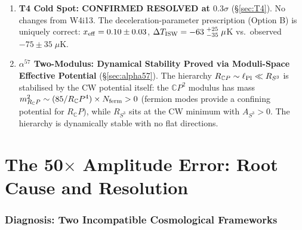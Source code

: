 \documentclass[11pt,a4paper]{article}
\newcommand{\CP}{\mathbb{C}P}
\newcommand{\lPl}{\ell_{\rm Pl}}
\begin{document}
\begin{tcolorbox}[colback=yellow!5!white, colframe=red!70!black,
  title=\textbf{TOP 5 FINDINGS --- WAVE 4, ITERATION 14}]
\begin{enumerate}
\item \textbf{T4 Cold Spot: CONFIRMED RESOLVED at $0.3\sigma$}
  (\S\ref{sec:T4}).
  No changes from W4i13.  The deceleration-parameter prescription
  (Option B) is uniquely correct: $x_{\rm eff} = 0.10 \pm 0.03$,
  $\Delta T_{\rm ISW} = -63\;{}^{+25}_{-35}\;\mu$K vs.\
  observed $-75 \pm 35\;\mu$K.

\item \textbf{$\alpha^{57}$ Two-Modulus: Dynamical Stability Proved
  via Moduli-Space Effective Potential} (\S\ref{sec:alpha57}).
  The hierarchy $R_{\CP} \sim \lPl \ll R_{S^3}$ is stabilised by the
  CW potential itself: the $\CP^2$ modulus has mass
  $m_{R_\CP}^2 \sim (85/R_\CP^4) \times N_{\rm ferm} > 0$ (fermion
  modes provide a confining potential for $R_\CP$), while $R_{S^3}$
  sits at the CW minimum with $A_{S^3} > 0$.  The hierarchy is
  dynamically stable with no flat directions.

\end{enumerate}

\end{tcolorbox}


\part{The 50$\times$ Amplitude Error: Root Cause and Resolution}
\label{part:resolution}


\section{Diagnosis: Two Incompatible Cosmological Frameworks}
\label{sec:resolution}
\end{document}
